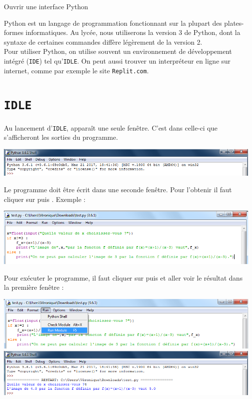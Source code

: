 \documentclass[12pt,oneside,french]{article}
\begin{document}
\large

\setcounter{section}{0}
\begin{center}{\huge Ouvrir une interface Python}\end{center}

Python est un langage de programmation fonctionnant sur la plupart des plates-formes informatiques.
Au lycée, nous utiliserons la version 3 de Python, dont la syntaxe de certaines commandes diffère légèrement de la version 2.\\
Pour utiliser Python, on utilise souvent un environnement de développement intégré (\texttt{IDE}) tel qu'\texttt{IDLE}. On peut aussi trouver un interpréteur en ligne sur internet, comme par exemple le site \texttt{Replit.com}.

\section{\texttt{IDLE}}

Au lancement d'\texttt{IDLE}, apparaît une seule fenêtre. C'est dans celle-ci que s'afficheront les sorties du programme.\medskip

\includegraphics[width=\linewidth]{IDLEsorties.png}

Le programme doit être écrit dans une seconde fenêtre. Pour l'obtenir il faut cliquer sur  puis . Exemple :\medskip

\includegraphics[width=\linewidth]{IDLEprog.png}

Pour exécuter le programme, il faut cliquer sur  puis  et aller voir le résultat dans la première fenêtre :\medskip

\includegraphics[width=\linewidth]{IDLErun.png}
\includegraphics[width=\linewidth]{IDLEout.png}
\end{document}

